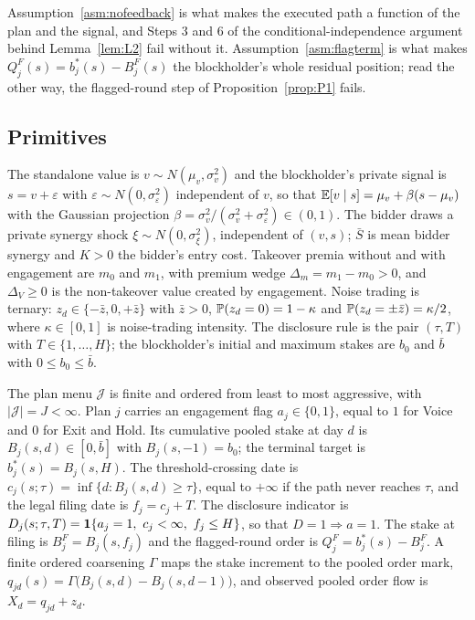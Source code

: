 Assumption~\ref{asm:nofeedback} is what makes the executed path a function of the plan and the
signal, and Steps 3 and 6 of the conditional-independence argument behind Lemma~\ref{lem:L2} fail
without it. Assumption~\ref{asm:flagterm} is what makes $Q^F_j(s) = b^*_j(s) - B^F_j(s)$ the
blockholder's whole residual position; read the other way, the flagged-round step of
Proposition~\ref{prop:P1} fails.

\subsection{Primitives}
\label{sec:primitives}

\begin{definition}
\label{def:primitives}
The standalone value is $v \sim N(\mu_v,\sigma_v^2)$ and the blockholder's private signal is
$s = v + \varepsilon$ with $\varepsilon \sim N(0,\sigma_\varepsilon^2)$ independent of $v$, so that
$\mathbb{E}[v \mid s] = \mu_v + \beta(s-\mu_v)$ with the Gaussian projection
$\beta = \sigma_v^2/(\sigma_v^2+\sigma_\varepsilon^2) \in (0,1)$. The bidder draws a private synergy
shock $\xi \sim N(0,\sigma_\xi^2)$, independent of $(v,s)$; $\bar S$ is mean bidder synergy and
$K > 0$ the bidder's entry cost. Takeover premia without and with engagement are $m_0$ and $m_1$,
with premium wedge $\Delta_m = m_1 - m_0 > 0$, and $\Delta_V \ge 0$ is the non-takeover value
created by engagement. Noise trading is ternary: $z_d \in \{-\bar z, 0, +\bar z\}$ with $\bar z > 0$,
$\mathbb{P}(z_d = 0) = 1-\kappa$ and $\mathbb{P}(z_d = \pm\bar z) = \kappa/2$, where $\kappa \in [0,1]$ is
noise-trading intensity. The disclosure rule is the pair $(\tau,T)$ with $T \in \{1,\dots,H\}$; the
blockholder's initial and maximum stakes are $b_0$ and $\bar b$ with $0 \le b_0 \le \bar b$.
\end{definition}

\begin{definition}
\label{def:plans}
The plan menu $\mathcal J$ is finite and ordered from least to most aggressive, with
$|\mathcal J| = J < \infty$. Plan $j$ carries an engagement flag $a_j \in \{0,1\}$, equal to $1$ for
Voice and $0$ for Exit and Hold. Its cumulative pooled stake at day $d$ is $B_j(s,d) \in [0,\bar b]$
with $B_j(s,-1) = b_0$; the terminal target is $b_j^*(s) = B_j(s,H)$. The threshold-crossing date is
$c_j(s;\tau) = \inf\{d : B_j(s,d) \ge \tau\}$, equal to $+\infty$ if the path never reaches $\tau$,
and the legal filing date is $f_j = c_j + T$. The disclosure indicator is
$D_j(s;\tau,T) = \mathbf{1}\{a_j = 1,\ c_j < \infty,\ f_j \le H\}$, so that $D = 1 \Rightarrow a = 1$. The
stake at filing is $B_j^F = B_j(s,f_j)$ and the flagged-round order is
$Q_j^F = b_j^*(s) - B_j^F$. A finite ordered coarsening $\Gamma$ maps the stake increment to the
pooled order mark, $q_{jd}(s) = \Gamma\bigl(B_j(s,d) - B_j(s,d-1)\bigr)$, and observed pooled order
flow is $X_d = q_{jd} + z_d$.
\end{definition}

